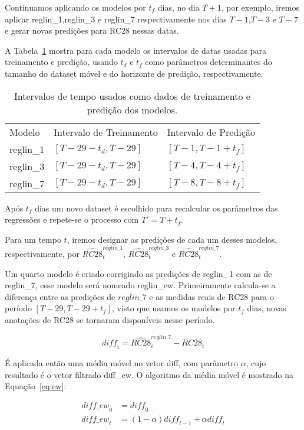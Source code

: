 Continuamos aplicando os modelos por $t_f$ dias,
no dia $T+1$, por exemplo, iremos aplicar reglin\_1,reglin\_3 e
reglin\_7 respectivamente nos dias $T-1$,$T-3$ e $T-7$ e gerar novas predições
para RC28 nessas datas.  

A Tabela~\ref{tab:ranges} mostra para cada modelo os intervalos de
datas usadas para treinamento e predição, usando $t_d$ e $t_f$ como parâmetros
determinantes do tamanho do dataset móvel e do horizonte de predição, respectivamente.


\begin{table}[]
  \centering 
  \begin{tabular}{lll}
    Modelo    & Intervalo de Treinamento & Intervalo de Predição \\
    reglin\_1 & $[T-29-t_d,T-29]$        & $[T-1, T-1+t_f]$      \\
    reglin\_3 &  $[T-29-t_d,T-29]$       &  $[T-4, T-4+t_f]$      \\
    reglin\_7 &   $[T-29-t_d,T-29]$      &   $[T-8, T-8+t_f]$       
  \end{tabular}
  \caption{Intervalos de tempo usados como dados de treinamento e predição dos modelos.}
  \label{tab:ranges}
\end{table}


Após $t_f$ dias um novo dataset é escolhido para recalcular os parâmetros das regressões e repete-se o processo com $T' = T + t_f$.


Para um tempo $t$, iremos designar as predições de cada um desses modelos,
respectivamente, por $\hat{RC28}^{reglin\_1}_t$, $\hat{RC28}^{reglin\_3}_t$ e $\hat{RC28}^{reglin\_7}_t$.

Um quarto modelo é criado corrigindo as predições de reglin\_1 com as de
reglin\_7, esse modelo será nomeado reglin\_ew. Primeiramente calcula-se a
diferença entre as predições de $reglin\_7$ e as medidas reais de RC28 para o período
$[T-29,T-29 + t_f]$, visto que usamos os modelos por $t_f$ dias, novas
anotações de RC28 se tornaram disponíveis nesse período. 


\[
  \mathit{diff}_i = \hat{RC28}^{reglin\_7}_i - RC28_i
\]

É aplicada então uma média móvel no vetor diff, com parâmetro
$\alpha$, cujo resultado é o vetor filtrado diff\_ew. O algoritmo da média móvel
é mostrado na Equação~\ref{eq:ew}:


  \begin{align}
    \mathit{diff\_ew}_0 &= \mathit{diff}_0 \\
  \mathit{diff\_ew}_t &= (1- \alpha)\mathit{diff}_{t-1} + \alpha \mathit{diff}_t 
  \label{eq:ew}
  \end{align}


